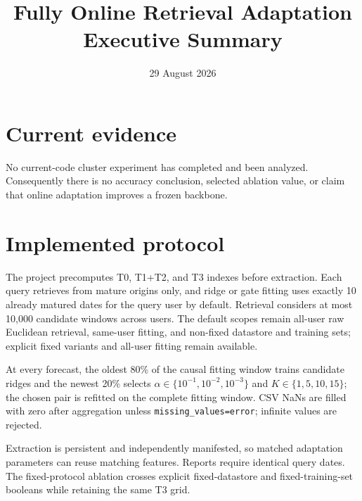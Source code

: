 \documentclass[11pt]{article}
\title{Fully Online Retrieval Adaptation\\Executive Summary}
\author{}
\date{29 August 2026}
\begin{document}
\maketitle
\small

\section*{Current evidence}
No current-code cluster experiment has completed and been analyzed.
Consequently there is no accuracy conclusion, selected ablation value, or
claim that online adaptation improves a frozen backbone.

\section*{Implemented protocol}
The project precomputes T0, T1+T2, and T3 indexes before extraction. Each query
retrieves from mature origins only, and ridge or gate fitting uses exactly 10
already matured dates for the query user by default. Retrieval considers at
most 10,000 candidate windows across users. The default scopes remain
all-user raw Euclidean retrieval, same-user fitting, and non-fixed datastore
and training sets; explicit fixed variants and all-user fitting remain
available.

At every forecast, the oldest 80\% of the causal fitting window trains
candidate ridges and the newest 20\% selects
$\alpha\in\{10^{-1},10^{-2},10^{-3}\}$ and
$K\in\{1,5,10,15\}$; the chosen pair is refitted on the complete fitting
window. CSV NaNs are filled with zero after aggregation unless
\texttt{missing\_values=error}; infinite values are rejected.

Extraction is persistent and independently manifested, so matched adaptation
parameters can reuse matching features. Reports require identical query dates.
The fixed-protocol ablation crosses explicit fixed-datastore and
fixed-training-set booleans while retaining the same T3 grid.
\end{document}
